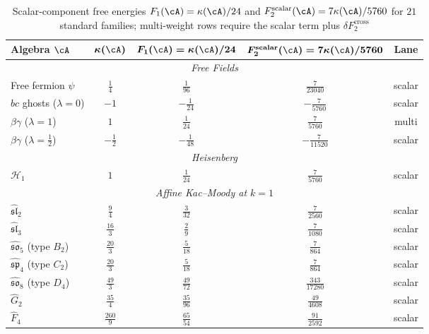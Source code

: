 \begin{table}[ht]
\centering
\caption{Scalar-component free energies $F_1(\cA)=\kappa(\cA)/24$ and
$F_2^{\mathrm{scalar}}(\cA)=7\kappa(\cA)/5760$ for $21$ standard families;
multi-weight rows require the scalar term plus
$\delta F_2^{\mathrm{cross}}$}
\label{tab:free-energy-landscape}
\renewcommand{\arraystretch}{1.5}
{\small
\begin{tabular}{|l|c|c|c|c|}
\hline
\textbf{Algebra $\cA$}
 & $\boldsymbol{\kappa(\cA)}$
 & $\boldsymbol{F_1(\cA)=\kappa(\cA)/24}$
 & $\boldsymbol{F_2^{\mathrm{scalar}}(\cA)=7\kappa(\cA)/5760}$
 & \textbf{Lane} \\
\hline
\multicolumn{5}{|c|}{\textit{Free Fields}} \\
\hline
Free fermion $\psi$ & $\tfrac{1}{4}$ & $\tfrac{1}{96}$ & $\tfrac{7}{23040}$ & scalar \\
\hline
$bc$ ghosts ($\lambda{=}0$) & $-1$ & $-\tfrac{1}{24}$ & $-\tfrac{7}{5760}$ & scalar \\
\hline
$\beta\gamma$ ($\lambda{=}1$) & $1$ & $\tfrac{1}{24}$ & $\tfrac{7}{5760}$ & multi \\
\hline
$\beta\gamma$ ($\lambda{=}\tfrac{1}{2}$) & $-\tfrac{1}{2}$ & $-\tfrac{1}{48}$ & $-\tfrac{7}{11520}$ & scalar \\
\hline
\multicolumn{5}{|c|}{\textit{Heisenberg}} \\
\hline
$\mathcal{H}_1$ & $1$ & $\tfrac{1}{24}$ & $\tfrac{7}{5760}$ & scalar \\
\hline
\multicolumn{5}{|c|}{\textit{Affine Kac--Moody at $k = 1$}} \\
\hline
$\widehat{\mathfrak{sl}}_2$ & $\tfrac{9}{4}$ & $\tfrac{3}{32}$ & $\tfrac{7}{2560}$ & scalar \\
\hline
$\widehat{\mathfrak{sl}}_3$ & $\tfrac{16}{3}$ & $\tfrac{2}{9}$ & $\tfrac{7}{1080}$ & scalar \\
\hline
$\widehat{\mathfrak{so}}_{5}$ (type $B_2$) & $\tfrac{20}{3}$ & $\tfrac{5}{18}$ & $\tfrac{7}{864}$ & scalar \\
\hline
$\widehat{\mathfrak{sp}}_{4}$ (type $C_2$) & $\tfrac{20}{3}$ & $\tfrac{5}{18}$ & $\tfrac{7}{864}$ & scalar \\
\hline
$\widehat{\mathfrak{so}}_{8}$ (type $D_4$) & $\tfrac{49}{3}$ & $\tfrac{49}{72}$ & $\tfrac{343}{17280}$ & scalar \\
\hline
$\widehat{G}_2$ & $\tfrac{35}{4}$ & $\tfrac{35}{96}$ & $\tfrac{49}{4608}$ & scalar \\
\hline
$\widehat{F}_4$ & $\tfrac{260}{9}$ & $\tfrac{65}{54}$ & $\tfrac{91}{2592}$ & scalar \\

\end{tabular}}
\end{table}
